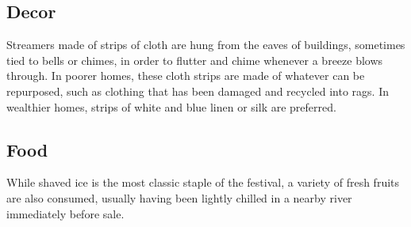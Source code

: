\documentclass[10pt,a4paper,twoside,bg=print,twocolumn,openany,nodeprecatedcode]{dndbook}
\begin{document}
\subsection{Decor}
Streamers made of strips of cloth are hung from the eaves of buildings, sometimes tied to bells or chimes, in order to flutter and chime whenever a breeze blows through. In poorer homes, these cloth strips are made of whatever can be repurposed, such as clothing that has been damaged and recycled into rags. In wealthier homes, strips of white and blue linen or silk are preferred.
\subsection{Food}
While shaved ice is the most classic staple of the festival, a variety of fresh fruits are also consumed, usually having been lightly chilled in a nearby river immediately before sale.
\end{document}
